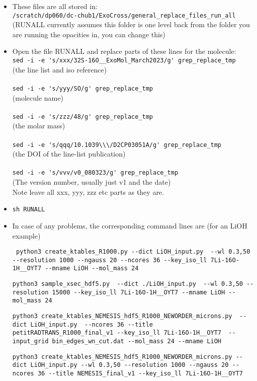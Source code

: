 \documentclass{article}
\begin{document}
\begin{itemize}
\item These files are all stored in: \\
\verb|/scratch/dp060/dc-chub1/ExoCross/general_replace_files_run_all| \\
(RUNALL currently assumes this folder is one level back from the folder you are running the opacities in, you can change this)
\item Open the file RUNALL and replace parts of these lines for the molecule: \\
\verb|sed -i -e 's/xxx/32S-16O__ExoMol_March2023/g' grep_replace_tmp| \\
(the line list and iso reference) \\ \\
\verb|sed -i -e 's/yyy/SO/g' grep_replace_tmp| \\
(molecule name) \\ \\
\verb|sed -i -e 's/zzz/48/g' grep_replace_tmp| \\
(the molar mass) \\ \\
\verb|sed -i -e 's/qqq/10.1039\\\/D2CP03051A/g' grep_replace_tmp| \\
(the DOI of the line-list publication) \\ \\
\verb|sed -i -e 's/vvv/v0_080323/g' grep_replace_tmp| \\
(The version number, usually just v1 and the date) \\
Note leave all xxx, yyy, zzz etc parts as they are.
\item \verb|sh RUNALL|
\item In case of any problems, the corresponding command lines are (for an LiOH example)

{\footnotesize \tt
\verb|python3 create_ktables_R1000.py --dict LiOH_input.py  --wl 0.3,50 --resolution 1000 --ngauss 20 --ncores 36 --key_iso_ll 7Li-16O-1H__OYT7 --mname LiOH --mol_mass 24|

\verb|python3 sample_xsec_hdf5.py  --dict ./LiOH_input.py  --wl 0.3,50 --resolution 15000 --key_iso_ll 7Li-16O-1H__OYT7 --mname LiOH --mol_mass 24|

\verb|python3 create_ktables_NEMESIS_hdf5_R1000_NEWORDER_microns.py  --dict LiOH_input.py  --ncores 36 --title petitRADTRANS_R1000_final_v1 --key_iso_ll 7Li-16O-1H__OYT7  --input_grid bin_edges_wn_cut.dat --mol_mass 24 --mname LiOH|

\verb|python3 create_ktables_NEMESIS_hdf5_R1000_NEWORDER_microns.py --dict LiOH_input.py --wl 0.3,50 --resolution 1000 --ngauss 20 --ncores 36 --title NEMESIS_final_v1 --key_iso_ll 7Li-16O-1H__OYT7|
}

\end{itemize}
\end{document}
